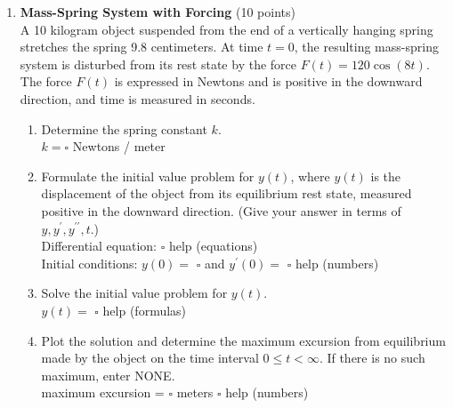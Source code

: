 \begin{enumerate}
  \item \textbf{Mass-Spring System with Forcing} (10 points)\\
  A 10 kilogram object suspended from the end of a vertically hanging spring stretches the spring 9.8 centimeters. At time $t=0$, the resulting mass-spring system is disturbed from its rest state by the force $F(t)=120 \cos (8 t)$. The force $F(t)$ is expressed in Newtons and is positive in the downward direction, and time is measured in seconds.
  \begin{enumerate}[label=(\alph*)]
    \item Determine the spring constant $k$.\\
    $k=\square$ Newtons / meter\\
    \begin{subanswer}
    \end{subanswer}
    \item Formulate the initial value problem for $y(t)$, where $y(t)$ is the displacement of the object from its equilibrium rest state, measured positive in the downward direction. (Give your answer in terms of $y, y^{\prime}, y^{\prime \prime}, t$.)\\
    Differential equation: $\square$ help (equations)\\
    Initial conditions: $y(0)=$ $\square$ and $y^{\prime}(0)=$ $\square$ help (numbers)\\
    \begin{subanswer}
    \end{subanswer}
    \item Solve the initial value problem for $y(t)$.\\
    $y(t)=$ $\square$ help (formulas)\\
    \begin{subanswer}
    \end{subanswer}
    \item Plot the solution and determine the maximum excursion from equilibrium made by the object on the time interval $0 \leq t<\infty$. If there is no such maximum, enter NONE.\\
    maximum excursion = $\square$ meters $\square$ help (numbers)\\
    \begin{subanswer}
    \end{subanswer}
  \end{enumerate}


\end{enumerate}
